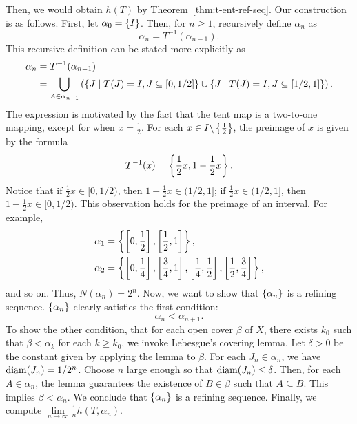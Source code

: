 \documentclass[10pt,twoside,draft]{book}
\begin{document}
Then, we would obtain $h(T)$ by Theorem~\ref{thm:t-ent-ref-seq}.
Our construction is as follows.
First, let $\alpha_0 = \left \{ I \right \}$.
Then, for $n \geq 1$, recursively define $\alpha_n$ as
\begin{equation*}
  \alpha_n = T^{-1}(\alpha_{n-1}).
\end{equation*}
%
This recursive definition can be stated more explicitly as
\begin{align*}
  \alpha_n &= T^{-1}(\alpha_{n-1}) \\
  &= \bigcup\limits_{A \in \alpha_{n-1}} \left (  \left \{ J \mathrel{} \middle| \mathrel{} T(J) = I, J \subseteq [0,1/2] \right \} \cup \left \{ J \mathrel{} \middle| \mathrel{} T(J) = I, J \subseteq [1/2,1] \right \} \right ).
\end{align*}
The expression is motivated by the fact that the tent map is a two-to-one mapping, except for when $x = \frac{1}{2}$.
For each $x \in I \backslash \left \{ \frac{1}{2} \right \}$, the preimage of $x$ is given by the formula
\begin{equation*}
  T^{-1}(x) = \left \{ \frac{1}{2} x, 1 - \frac{1}{2} x \right \}.
\end{equation*}
Notice that if $\frac{1}{2} x \in [0,1/2)$, then $1 - \frac{1}{2} x \in (1/2,1]$; if $\frac{1}{2} x \in (1/2,1]$, then $1 - \frac{1}{2} x \in [0,1/2)$. %
This observation holds for the preimage of an interval.
For example,
\begin{align*}
  \alpha_1 &= \left \{ \left [ 0,\frac{1}{2} \right ], \left [ \frac{1}{2}, 1 \right ] \right \}, \\
  \alpha_2 &= \left \{ \left [ 0,\frac{1}{4} \right ], \left [ \frac{3}{4}, 1 \right ], \left [ \frac{1}{4}, \frac{1}{2} \right ], \left [ \frac{1}{2}, \frac{3}{4} \right ] \right \},
\end{align*}
and so on.
Thus, $N(\alpha_{n}) = 2^n$.
Now, we want to show that $\left \{ \alpha_n \right \}$ is a refining sequence.
$\left \{ \alpha_n \right \}$ clearly satisfies the first condition:
\begin{equation*}
  \alpha_n < \alpha_{n+1}.
\end{equation*}
To show the other condition, that for each open cover $\beta$ of $X$, there exists $k_0$ such that $\beta < \alpha_k$ for each $k \geq k_0$, we invoke Lebesgue's covering lemma.
Let $\delta > 0$ be the constant given by applying the lemma to $\beta$.
For each $J_n \in \alpha_n$, we have $\mathrm{diam}(J_n) = 1/{2^n}$.
Choose $n$ large enough so that $\mathrm{diam}(J_n) \leq \delta$.
Then, for each $A \in \alpha_n$, the lemma guarantees the existence of $B \in \beta$ such that $A \subseteq B$.
This implies $\beta < \alpha_n$.
We conclude that $\left \{ \alpha_n \right \}$ is a refining sequence.
Finally, we compute $\lim\limits_{n \to \infty} \frac{1}{n} h(T, \alpha_n)$.
\end{document}
